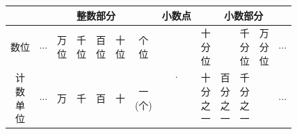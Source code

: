 




\newpage

\begin{table}[htbp]
    \centering
    \renewcommand{\arraystretch}{1.5} %
    \begin{tabular}{|c|c|c|c|c|c|c|c|c|c|c|c|c|}
        \hline
        & \multicolumn{6}{c|}{整数部分} 
        & 小数点 
        & \multicolumn{5}{c|}{小数部分} \\
        \hline
        
        数位 
        & $\cdots$ 
        & \makecell{万\\位} 
        & \makecell{千\\位} 
        & \makecell{百\\位} 
        & \makecell{十\\位} 
        & \makecell{个\\位} 
        & \multirow{2}{*}{$\cdot$} %
        & \makecell{十\\分\\位} 
        & %
        & \makecell{千\\分\\位} 
        & \makecell{万\\分\\位} 
        & $\cdots$ \\
        \cline{1-7} \cline{9-13} %
        
        \makecell{计\\数\\单\\位} 
        & $\cdots$ 
        & 万 & 千 & 百 & 十 
        & \makecell{一\\(个)} 
        & %
        & \makecell{十\\分\\之\\一} 
        & \makecell{百\\分\\之\\一} 
        & \makecell{千\\分\\之\\一} 
        & %
        & $\cdots$ \\
        \hline
    \end{tabular}
\end{table}

